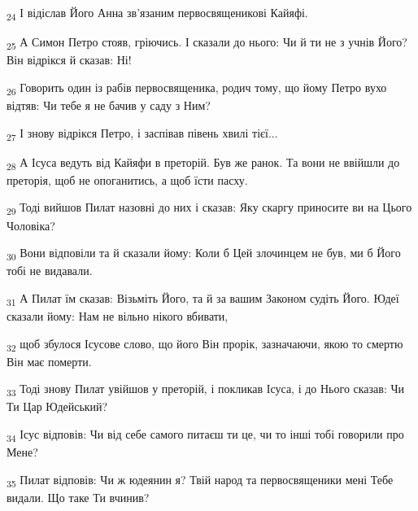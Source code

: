 \begin{tcolorbox}
\textsubscript{24} І відіслав Його Анна зв'язаним первосвященикові Кайяфі.
\end{tcolorbox}
\begin{tcolorbox}
\textsubscript{25} А Симон Петро стояв, гріючись. І сказали до нього: Чи й ти не з учнів Його? Він відрікся й сказав: Ні!
\end{tcolorbox}
\begin{tcolorbox}
\textsubscript{26} Говорить один із рабів первосвященика, родич тому, що йому Петро вухо відтяв: Чи тебе я не бачив у саду з Ним?
\end{tcolorbox}
\begin{tcolorbox}
\textsubscript{27} І знову відрікся Петро, і заспівав півень хвилі тієї...
\end{tcolorbox}
\begin{tcolorbox}
\textsubscript{28} А Ісуса ведуть від Кайяфи в преторій. Був же ранок. Та вони не ввійшли до преторія, щоб не опоганитись, а щоб їсти пасху.
\end{tcolorbox}
\begin{tcolorbox}
\textsubscript{29} Тоді вийшов Пилат назовні до них і сказав: Яку скаргу приносите ви на Цього Чоловіка?
\end{tcolorbox}
\begin{tcolorbox}
\textsubscript{30} Вони відповіли та й сказали йому: Коли б Цей злочинцем не був, ми б Його тобі не видавали.
\end{tcolorbox}
\begin{tcolorbox}
\textsubscript{31} А Пилат їм сказав: Візьміть Його, та й за вашим Законом судіть Його. Юдеї сказали йому: Нам не вільно нікого вбивати,
\end{tcolorbox}
\begin{tcolorbox}
\textsubscript{32} щоб збулося Ісусове слово, що його Він прорік, зазначаючи, якою то смертю Він має померти.
\end{tcolorbox}
\begin{tcolorbox}
\textsubscript{33} Тоді знову Пилат увійшов у преторій, і покликав Ісуса, і до Нього сказав: Чи Ти Цар Юдейський?
\end{tcolorbox}
\begin{tcolorbox}
\textsubscript{34} Ісус відповів: Чи від себе самого питаєш ти це, чи то інші тобі говорили про Мене?
\end{tcolorbox}
\begin{tcolorbox}
\textsubscript{35} Пилат відповів: Чи ж юдеянин я? Твій народ та первосвященики мені Тебе видали. Що таке Ти вчинив?
\end{tcolorbox}
